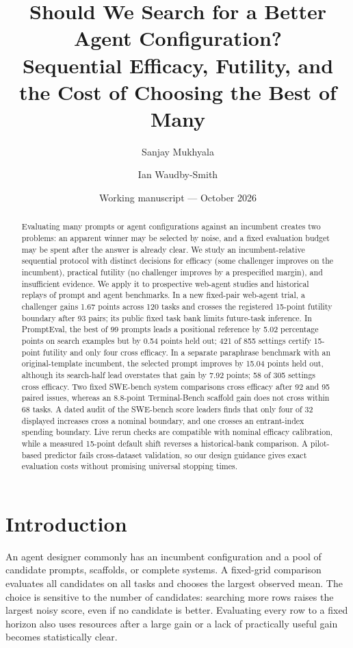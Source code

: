 \documentclass[11pt]{article}
\title{Should We Search for a Better Agent Configuration?\\
\large Sequential Efficacy, Futility, and the Cost of Choosing the Best of Many}
\author{Sanjay Mukhyala \and Ian Waudby-Smith}
\date{Working manuscript --- October 2026}
\begin{document}
\maketitle

\begin{abstract}
Evaluating many prompts or agent configurations against an incumbent creates two problems: an apparent winner may be selected by noise, and a fixed evaluation budget may be spent after the answer is already clear. We study an incumbent-relative sequential protocol with distinct decisions for efficacy (some challenger improves on the incumbent), practical futility (no challenger improves by a prespecified margin), and insufficient evidence. We apply it to prospective web-agent studies and historical replays of prompt and agent benchmarks. In a new fixed-pair web-agent trial, a challenger gains 1.67 points across 120 tasks and crosses the registered 15-point futility boundary after 93 pairs; its public fixed task bank limits future-task inference. In PromptEval, the best of 99 prompts leads a positional reference by 5.02 percentage points on search examples but by 0.54 points held out; 421 of 855 settings certify 15-point futility and only four cross efficacy. In a separate paraphrase benchmark with an original-template incumbent, the selected prompt improves by 15.04 points held out, although its search-half lead overstates that gain by 7.92 points; 58 of 305 settings cross efficacy. Two fixed SWE-bench system comparisons cross efficacy after 92 and 95 paired issues, whereas an 8.8-point Terminal-Bench scaffold gain does not cross within 68 tasks. A dated audit of the SWE-bench score leaders finds that only four of 32 displayed increases cross a nominal boundary, and one crosses an entrant-index spending boundary. Live rerun checks are compatible with nominal efficacy calibration, while a measured 15-point default shift reverses a historical-bank comparison. A pilot-based predictor fails cross-dataset validation, so our design guidance gives exact evaluation costs without promising universal stopping times.
\end{abstract}

\section{Introduction}
An agent designer commonly has an incumbent configuration and a pool of candidate prompts, scaffolds, or complete systems. A fixed-grid comparison evaluates all candidates on all tasks and chooses the largest observed mean. The choice is sensitive to the number of candidates: searching more rows raises the largest noisy score, even if no candidate is better. Evaluating every row to a fixed horizon also uses resources after a large gain or a lack of practically useful gain becomes statistically clear.
\end{document}
